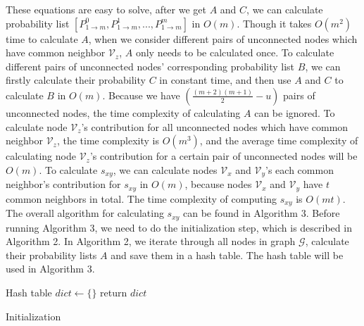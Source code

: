 \documentclass[\main/thesis.tex]{subfiles}
\begin{document}
These equations are easy to solve, after we get $A$ and $C$, we can calculate probability list $[P_{1\rightarrow m}^0, P_{1\rightarrow m}^1, ..., P_{1\rightarrow m}^{m}]$ in $O(m)$. Though it takes $O(m^2)$ time to calculate $A$, when we consider different pairs of unconnected nodes which have common neighbor $\mathcal{V}_z$, $A$ only needs to be calculated once. To calculate different pairs of unconnected nodes' corresponding probability list $B$, we can firstly calculate their probability $C$ in constant time, and then use $A$ and $C$ to calculate $B$ in $O(m)$. Because we have $(\frac{(m+2)(m+1)}{2}-u)$ pairs of unconnected nodes, the time complexity of calculating $A$ can be ignored. To calculate node $\mathcal{V}_z$'s contribution for all unconnected nodes which have common neighbor $\mathcal{V}_z$, the time complexity is $O(m^3)$, and the average time complexity of calculating node $\mathcal{V}_z$'s contribution for a certain pair of unconnected nodes will be $O(m)$. To calculate $s_{xy}$, we can calculate nodes $\mathcal{V}_x$ and $\mathcal{V}_y$'s each common neighbor's contribution for $s_{xy}$ in $O(m)$, because nodes $\mathcal{V}_x$ and $\mathcal{V}_y$ have $t$ common neighbors in total. The time complexity of computing $s_{xy}$ is $O(mt)$. The overall algorithm for calculating $s_{xy}$ can be found in Algorithm 3. Before running Algorithm 3, we need to do the initialization step, which is described in Algorithm 2. In Algorithm 2, we iterate through all nodes in graph $\mathcal{G}$, calculate their probability lists $A$ and save them in a hash table. The hash table will be used in Algorithm 3.

\begin{algorithm}
Hash table $dict \leftarrow \{\}$\;
return $dict$\;
\caption{Initialization}
\end{algorithm}
\end{document}
